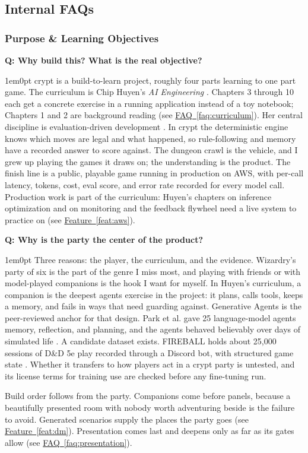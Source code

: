 \documentclass[11pt,letterpaper]{article}
\newcounter{faqnum}
\newenvironment{faqpair}[1]{%
  \needspace{4\baselineskip}\vspace{0.5em}\refstepcounter{faqnum}%
  \noindent\textbf{\color{SectionBlue}Q\thefaqnum: #1}\par\nopagebreak[4]%
  \vspace{0.2em}\begin{adjustwidth}{1em}{0pt}\setlength{\parindent}{0pt}%
}{\end{adjustwidth}\vspace{0.5em}}
\newcommand{\faqref}[1]{\hyperref[#1]{FAQ~\ref*{#1}}}
\newcommand{\featureref}[1]{\hyperref[#1]{Feature~\ref*{#1}}}
\begin{document}
\newpage
\subsection*{Internal FAQs}

\subsubsection*{Purpose \& Learning Objectives}

\begin{faqpair}{Why build this? What is the real objective?}\label{faq:why}
crypt is a build-to-learn project, roughly four parts learning to one part
game. The curriculum is Chip Huyen's \textit{AI Engineering}
\cite{huyen2025aie}. Chapters 3 through 10 each get a concrete exercise in
a running application instead of a toy notebook; Chapters 1 and 2 are
background reading (see \faqref{faq:curriculum}). Her central discipline is
evaluation-driven development \cite{huyen2025aie}. In crypt the
deterministic engine knows which moves are legal and what happened, so
rule-following and memory have a recorded answer to score against. The
dungeon crawl is the vehicle, and I grew up playing the games it draws
on; the understanding is the product. The finish line is a public, playable
game running in production on AWS, with per-call latency, tokens, cost,
eval score, and error rate recorded for every model call. Production work is
part of the curriculum: Huyen's chapters on inference optimization and on
monitoring and the feedback flywheel need a live system to practice on
(see \featureref{feat:aws}).
\end{faqpair}

\begin{faqpair}{Why is the party the center of the product?}\label{faq:party}
Three reasons: the player, the curriculum, and the evidence. Wizardry's
party of six is the part of the genre I miss most, and playing with friends
or with model-played companions is the hook I want for myself. In Huyen's
curriculum, a companion is the deepest agents exercise in the project: it
plans, calls tools, keeps a memory, and fails in ways that need guarding
against. Generative Agents is the peer-reviewed anchor for that design.
Park et al. gave 25 language-model agents memory, reflection, and planning,
and the agents behaved believably over days of simulated life
\cite{park2023generativeagents}. A candidate dataset exists. FIREBALL
holds about 25,000 sessions of D\&D 5e play recorded through a Discord bot,
with structured game state \cite{zhu2023fireball}. Whether it transfers to
how players act in a crypt party is untested, and its license terms for
training use are checked before any fine-tuning run.

Build order follows from the party. Companions come before panels, because
a beautifully presented room with nobody worth adventuring beside is the
failure to avoid. Generated scenarios supply the places the party goes
(see \featureref{feat:dm}). Presentation comes last and deepens only as far
as its gates allow (see \faqref{faq:presentation}).
\end{faqpair}
\end{document}
